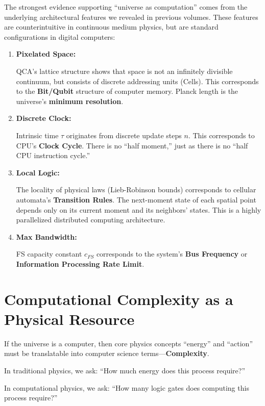 The strongest evidence supporting ``universe as computation'' comes from the underlying architectural features we revealed in previous volumes. These features are counterintuitive in continuous medium physics, but are standard configurations in digital computers:

\begin{enumerate}
\item \textbf{Pixelated Space:}

   QCA's lattice structure shows that space is not an infinitely divisible continuum, but consists of discrete addressing units (Cells). This corresponds to the \textbf{Bit/Qubit} structure of computer memory. Planck length is the universe's \textbf{minimum resolution}.

\item \textbf{Discrete Clock:}

   Intrinsic time $\tau$ originates from discrete update steps $n$. This corresponds to CPU's \textbf{Clock Cycle}. There is no ``half moment,'' just as there is no ``half CPU instruction cycle.''

\item \textbf{Local Logic:}

   The locality of physical laws (Lieb-Robinson bounds) corresponds to cellular automata's \textbf{Transition Rules}. The next-moment state of each spatial point depends only on its current moment and its neighbors' states. This is a highly parallelized distributed computing architecture.

\item \textbf{Max Bandwidth:}

   FS capacity constant $c_{FS}$ corresponds to the system's \textbf{Bus Frequency} or \textbf{Information Processing Rate Limit}.
\end{enumerate}

\section{Computational Complexity as a Physical Resource}

If the universe is a computer, then core physics concepts ``energy'' and ``action'' must be translatable into computer science terms---\textbf{Complexity}.

In traditional physics, we ask: ``How much energy does this process require?''

In computational physics, we ask: ``How many logic gates does computing this process require?''

